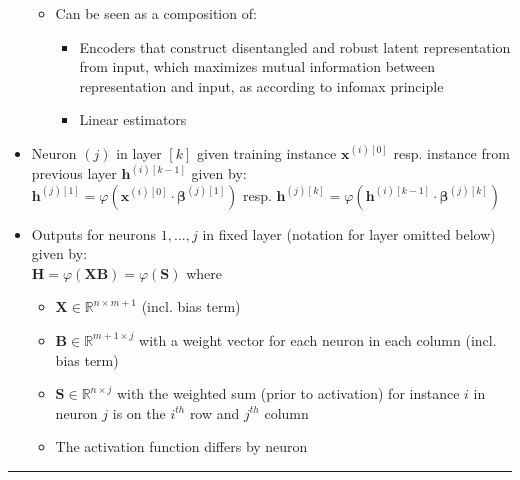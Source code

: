 \begin{itemize}
    \begin{itemize}
        \item Can be seen as a composition of:
        \begin{itemize}
            \item Encoders that construct disentangled and robust latent representation from input, which maximizes mutual information between representation and input, as according to infomax principle
            \item Linear estimators
        \end{itemize}
    \end{itemize}
    \item Neuron $(j)$ in layer $[k]$ given training instance $\boldsymbol{x}^{(i)[0]}$ resp. instance from previous layer $\boldsymbol{h}^{(i)[k-1]}$ given by:\\
    $\boldsymbol{h}^{(j)[1]} = \varphi( \boldsymbol{x}^{(i)[0]} \cdot \boldsymbol{\beta}^{(j)[1]} )$ resp. $\boldsymbol{h}^{(j)[k]} = \varphi( \boldsymbol{h}^{(i)[k-1]} \cdot \boldsymbol{\beta}^{(j)[k]} )$ 
    \item Outputs for neurons $1, ..., j$ in fixed layer (notation for layer omitted below) given by:\\
    $\boldsymbol{H} = \varphi ( \boldsymbol{X} \boldsymbol{B} ) = \varphi ( \boldsymbol{S} )$ where
    \begin{itemize}
        \item $\boldsymbol{X} \in \mathbb{R}^{n \times m+1}$ (incl. bias term)
        \item $\boldsymbol{B} \in \mathbb{R}^{m+1 \times j}$ with a weight vector for each neuron in each column (incl. bias term)
        \item $\boldsymbol{S} \in \mathbb{R}^{n \times j}$ with the weighted sum (prior to activation) for instance $i$ in neuron $j$ is on the $i^{th}$ row and $j^{th}$ column
        \item The activation function differs by neuron
    \end{itemize}
\end{itemize}

{\color{lightgray}\hrule height 0.001mm}

